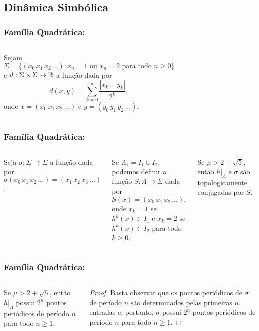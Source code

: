 \subsection{Dinâmica Simbólica}


\begin{frame}
\vspace{5pt}
\frametitle{Família Quadrática: \subsecname}
\begin{columns}
\column{\dimexpr\paperwidth-15pt}

Sejam
$$\Sigma = \lbrace (x_0 \, x_1 \, x_2 \, \dots) : x_n = 1 \text{ ou } x_n = 2 \text{ para todo } n \geq 0 \rbrace$$
e $d : \Sigma \times \Sigma \to \mathbb{R}$ a função dada por
$$d(x, y) = \sum_{k=0}^\infty \frac{|x_k - y_k|}{2^k},$$
onde $x = (x_0 \, x_1 \, x_2 \, \dots)$ e $y = (y_0 \, y_1 \, y_2 \, \dots)$.

\end{columns}
\end{frame}


\begin{frame}
\vspace{5pt}
\frametitle{Família Quadrática: \subsecname}
\begin{columns}
\column{\dimexpr\paperwidth-15pt}

Seja $\sigma: \Sigma \to \Sigma$ a função dada por $\sigma(x_0 \, x_1 \, x_2 \, \dots) = (x_1 \, x_2 \, x_3 \, \dots)$.

Se $\Lambda_1 = I_1 \cup I_2$, podemos definir a função $S: \Lambda \to \Sigma$ dada por
$$S(x) = (x_0 \, x_1 \, x_2 \, \dots),$$ onde $x_k = 1$ se $h^k(x) \in I_1$ e $x_k = 2$ se $h^k(x) \in I_2$ para todo $k \geq 0$.

\begin{theorem}
Se $\mu > 2 + \sqrt{5}$, então $h|_\Lambda$ e $\sigma$ são topologicamente conjugadas por $S$.
\end{theorem}

\end{columns}
\end{frame}


\begin{frame}
\vspace{5pt}
\frametitle{Família Quadrática: \subsecname}
\begin{columns}
\column{\dimexpr\paperwidth-15pt}

\begin{corollary}
Se $\mu > 2 + \sqrt{5}$, então $h|_\Lambda$ possui $2^n$ pontos periódicos de período $n$ para todo $n \geq 1$.
\end{corollary}

\begin{proof}
Basta observar que os pontos periódicos de $\sigma$ de período $n$ são determinados pelas primeiras $n$ entradas e, portanto, $\sigma$ possui $2^n$ pontos periódicos de período $n$ para todo $n \geq 1$.
\end{proof}

\end{columns}
\end{frame}
